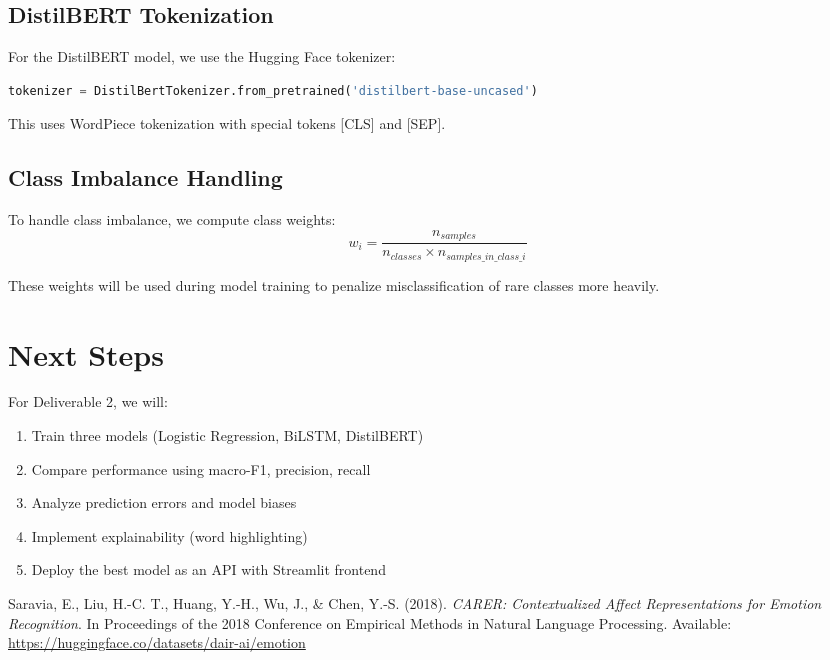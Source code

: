 \documentclass[12pt,a4paper]{article}
\begin{document}
\subsection{DistilBERT Tokenization}
For the DistilBERT model, we use the Hugging Face tokenizer:
\begin{lstlisting}[language=Python]
tokenizer = DistilBertTokenizer.from_pretrained('distilbert-base-uncased')
\end{lstlisting}

This uses WordPiece tokenization with special tokens [CLS] and [SEP].

\subsection{Class Imbalance Handling}
To handle class imbalance, we compute class weights:
\[
w_i = \frac{n_{samples}}{n_{classes} \times n_{samples\_in\_class\_i}}
\]

These weights will be used during model training to penalize misclassification of rare classes more heavily.

\section{Next Steps}

For Deliverable 2, we will:
\begin{enumerate}
    \item Train three models (Logistic Regression, BiLSTM, DistilBERT)
    \item Compare performance using macro-F1, precision, recall
    \item Analyze prediction errors and model biases
    \item Implement explainability (word highlighting)
    \item Deploy the best model as an API with Streamlit frontend
\end{enumerate}


\begin{thebibliography}{9}

Saravia, E., Liu, H.-C. T., Huang, Y.-H., Wu, J., \& Chen, Y.-S. (2018).
\textit{CARER: Contextualized Affect Representations for Emotion Recognition}.
In Proceedings of the 2018 Conference on Empirical Methods in Natural Language Processing.
Available: \url{https://huggingface.co/datasets/dair-ai/emotion}

\end{thebibliography}
\end{document}
